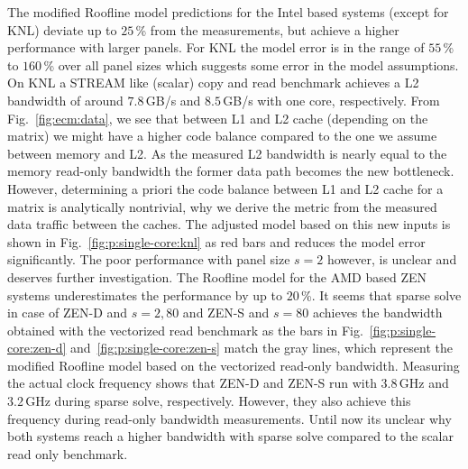 The modified Roofline model predictions for the Intel based systems (except for
KNL) deviate up to $25$\,\% from the measurements, but achieve a higher
performance with larger panels.
%
For KNL the model error is in the range of $55$\,\% to $160$\,\% over all panel
sizes which suggests some error in the model assumptions.
On KNL a STREAM like (scalar) copy and read benchmark achieves a L2 bandwidth of
around $7.8$\,GB/s and $8.5$\,GB/s with one core,
respectively.
From Fig.~\ref{fig:ecm:data}, we see that between L1 and L2 cache (depending on
the matrix) we might have a higher code
balance compared to the one we assume between memory and L2.
As the measured L2 bandwidth is nearly equal to the memory read-only bandwidth
the former data path becomes the new bottleneck.
However, determining a priori the code balance between L1 and L2 cache for a matrix
is analytically nontrivial, why we derive the metric from the measured data
traffic between the caches.
The adjusted model based on this new inputs is shown in
Fig.~\ref{fig:p:single-core:knl} as red bars and reduces the model error
significantly.
%
The poor performance with panel size $s = 2$ however, is unclear and deserves
further investigation. 
%
%
%
The Roofline model for the AMD based ZEN systems underestimates the
performance by up to $20$\,\%.
It seems that sparse solve in case of ZEN-D and $s=2, 80$ and ZEN-S and $s=80$
achieves the bandwidth obtained with the vectorized read benchmark as the bars
in Fig.~\ref{fig:p:single-core:zen-d} and~\ref{fig:p:single-core:zen-s} match
the gray lines, which represent the modified Roofline model based on the
vectorized read-only bandwidth.
Measuring the actual clock frequency shows that ZEN-D and ZEN-S run with
$3.8$\,GHz and $3.2$\,GHz during sparse solve, respectively.
However, they also achieve this frequency during read-only bandwidth
measurements.
Until now its unclear why both systems reach a higher bandwidth with sparse
solve compared to the scalar read only benchmark.
%

